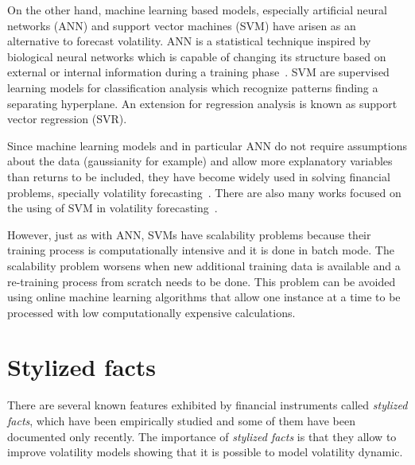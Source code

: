 On the other hand, machine learning based models, especially artificial neural networks (ANN) and support vector machines (SVM) have arisen as an alternative to forecast volatility. ANN is a statistical technique inspired by biological neural networks which is capable of changing its structure based on external or internal information during a training phase~\cite{sammut2011}. SVM are supervised learning models for classification analysis which recognize patterns finding a separating hyperplane. An extension for regression analysis is known as support vector regression (SVR). 

Since machine learning models and in particular ANN do not require assumptions about the data (gaussianity for example) and allow more explanatory variables than returns to be included, they have become widely used in solving financial problems, specially volatility forecasting~\cite{hamidetal2004,donaldsonetal1997}. There are also many works focused on the using of SVM in volatility forecasting~\cite{shiyietal2008,shiyietal2010,gavrishchaka2006,vasilios2012}. 

However, just as with ANN, SVMs have scalability problems because their training process is computationally intensive and it is done in batch mode. The scalability problem worsens when new additional training data is available and a re-training process from scratch needs to be done. This problem can be avoided using online machine learning algorithms that allow one instance at a time to be processed with low computationally expensive calculations.



\section{Stylized facts}
\label{sec:stylizedfacts}

There are several known features exhibited by financial instruments called \textit{stylized facts}, which have been empirically studied and some of them have been documented only recently. The importance of \textit{stylized facts} is that they allow to improve volatility models showing that it is possible to model volatility dynamic.

